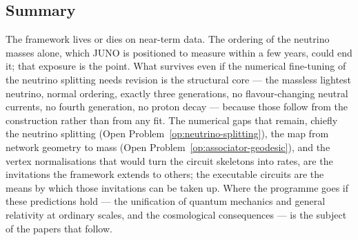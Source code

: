 \subsection{Summary}

The framework lives or dies on near-term data. The ordering of the neutrino masses alone, which JUNO
is positioned to measure within a few years, could end it; that exposure is the point. What survives
even if the numerical fine-tuning of the neutrino splitting needs revision is the structural core ---
the massless lightest neutrino, normal ordering, exactly three generations, no flavour-changing
neutral currents, no fourth generation, no proton decay --- because those follow from the
construction rather than from any fit. The numerical gaps that remain, chiefly the neutrino splitting
(Open Problem~\ref{op:neutrino-splitting}), the map from network geometry to mass
(Open Problem~\ref{op:associator-geodesic}), and the vertex normalisations that would turn the
circuit skeletons into rates, are the invitations the framework extends to others; the executable
circuits are the means by which those invitations can be taken up. Where the programme goes if these
predictions hold --- the unification of quantum mechanics and general relativity at ordinary scales,
and the cosmological consequences --- is the subject of the papers that follow.
